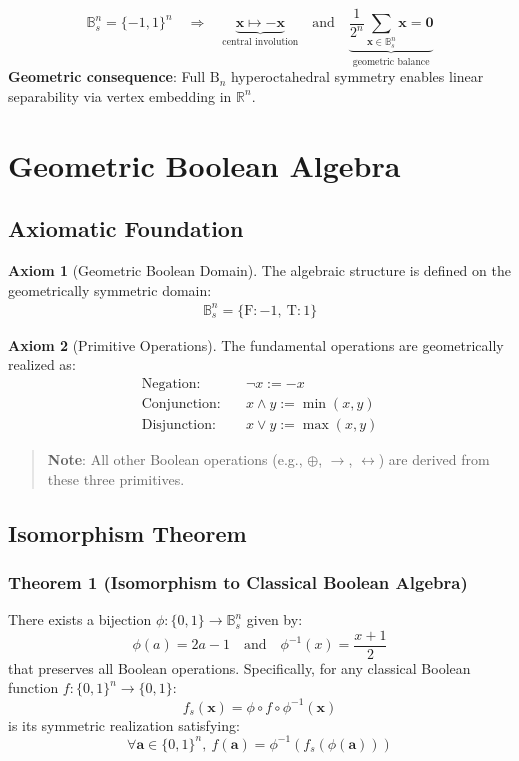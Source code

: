 \documentclass{article}
\begin{document}
\begin{equation}
\mathbb{B}_s^n = \{-1,1\}^n \quad \Rightarrow \quad \underbrace{\mathbf{x} \mapsto -\mathbf{x}}_{\text{central involution}} \quad \text{and} \quad \underbrace{\frac{1}{2^n}\sum_{\mathbf{x}\in\mathbb{B}_s^n}\mathbf{x} = \mathbf{0}}_{\text{geometric balance}}
\end{equation}
\textbf{Geometric consequence}:  Full $\mathrm{B}_n$ hyperoctahedral symmetry enables linear separability via vertex embedding in $\mathbb{R}^n$.


\section{Geometric Boolean Algebra}

\subsection{Axiomatic Foundation}
\textbf{Axiom 1} (Geometric Boolean Domain).
The algebraic structure is defined on the geometrically symmetric domain:
\begin{align}
\mathbb{B}_s^n = \{ \mathrm{F} : -1,\  \mathrm{T} : 1 \}
\end{align}

\textbf{Axiom 2} (Primitive Operations).
The fundamental operations are geometrically realized as:
\begin{align}
\text{Negation:}\quad & \neg x := -x \\
\text{Conjunction:}\quad & x \land y := \min(x,y) \\
\text{Disjunction:}\quad & x \lor y := \max(x,y)
\end{align}

\begin{quote}
\textbf{Note}: All other Boolean operations (e.g., $\oplus$, $\to$, $\leftrightarrow$) are derived from these three primitives.
\end{quote}

\subsection{Isomorphism Theorem}
\subsubsection{Theorem 1 (Isomorphism to Classical Boolean Algebra)}
There exists a bijection $\phi: \{0,1\} \to \mathbb{B}_s^n$ given by:
\begin{equation}
\phi(a) = 2a - 1 \quad \text{and} \quad \phi^{-1}(x) = \frac{x + 1}{2}
\end{equation}
that preserves all Boolean operations. Specifically, for any classical Boolean function $f: \{0,1\}^n \to \{0,1\}$:
\begin{equation}
f_s(\mathbf{x}) = \phi \circ f \circ \phi^{-1}(\mathbf{x})
\end{equation}
is its symmetric realization satisfying:
\begin{equation}
\forall \mathbf{a} \in \{0,1\}^n,\ f(\mathbf{a}) = \phi^{-1}\left( f_s(\phi(\mathbf{a})) \right)
\end{equation}
\end{document}
